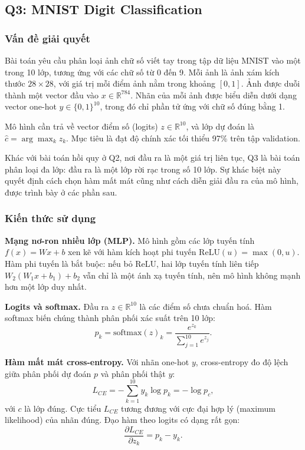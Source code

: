 \subsection{Q3: MNIST Digit Classification}

\subsubsection{Vấn đề giải quyết}
Bài toán yêu cầu phân loại ảnh chữ số viết tay trong tập dữ liệu MNIST
vào một trong 10 lớp, tương ứng với các chữ số từ 0 đến 9. Mỗi ảnh là ảnh
xám kích thước $28 \times 28$, với giá trị mỗi điểm ảnh nằm trong khoảng
$[0, 1]$. Ảnh được duỗi thành một vector đầu vào $x \in \mathbb{R}^{784}$.
Nhãn của mỗi ảnh được biểu diễn dưới dạng vector one-hot
$y \in \{0, 1\}^{10}$, trong đó chỉ phần tử ứng với chữ số đúng bằng 1.

Mô hình cần trả về vector điểm số (logits) $z \in \mathbb{R}^{10}$, và lớp
dự đoán là $\hat{c} = \arg\max_k z_k$. Mục tiêu là đạt độ chính xác tối
thiểu 97\% trên tập validation.

Khác với bài toán hồi quy ở Q2, nơi đầu ra là một giá trị liên tục, Q3 là
bài toán phân loại đa lớp: đầu ra là một lớp rời rạc trong số 10 lớp. Sự
khác biệt này quyết định cách chọn hàm mất mát cũng như cách diễn giải đầu
ra của mô hình, được trình bày ở các phần sau.

\subsubsection{Kiến thức sử dụng}

\textbf{Mạng nơ-ron nhiều lớp (MLP).} Mô hình gồm các lớp tuyến tính
$f(x) = Wx + b$ xen kẽ với hàm kích hoạt phi tuyến
$\mathrm{ReLU}(u) = \max(0, u)$. Hàm phi tuyến là bắt buộc: nếu bỏ ReLU,
hai lớp tuyến tính liên tiếp $W_2(W_1x + b_1) + b_2$ vẫn chỉ là một ánh xạ
tuyến tính, nên mô hình không mạnh hơn một lớp duy nhất.

\textbf{Logits và softmax.} Đầu ra $z \in \mathbb{R}^{10}$ là các điểm số
chưa chuẩn hoá. Hàm softmax biến chúng thành phân phối xác suất trên 10 lớp:
\begin{equation}
p_k = \mathrm{softmax}(z)_k = \frac{e^{z_k}}{\sum_{j=1}^{10} e^{z_j}}.
\end{equation}

\textbf{Hàm mất mát cross-entropy.} Với nhãn one-hot $y$, cross-entropy đo
độ lệch giữa phân phối dự đoán $p$ và phân phối thật $y$:
\begin{equation}
L_{CE} = -\sum_{k=1}^{10} y_k \log p_k = -\log p_c,
\end{equation}
với $c$ là lớp đúng. Cực tiểu $L_{CE}$ tương đương với cực đại hợp lý
(maximum likelihood) của nhãn đúng. Đạo hàm theo logits có dạng rất gọn:
\begin{equation}
\frac{\partial L_{CE}}{\partial z_k} = p_k - y_k.
\end{equation}

